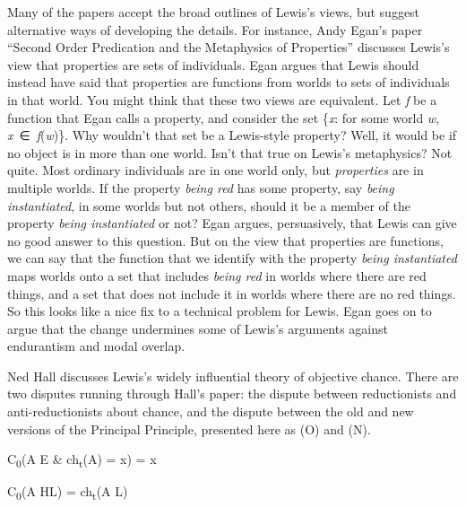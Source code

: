 \documentclass[
  10pt,
  letterpaper,
  DIV=11,
  numbers=noendperiod,
  twoside]{scrartcl}
\providecommand{\tightlist}{%
  \setlength{\itemsep}{0pt}\setlength{\parskip}{0pt}}\usepackage{longtable,booktabs,array}
\begin{document}
Many of the papers accept the broad outlines of Lewis's views, but
suggest alternative ways of developing the details. For instance, Andy
Egan's paper ``Second Order Predication and the Metaphysics of
Properties'' discusses Lewis's view that properties are sets of
individuals. Egan argues that Lewis should instead have said that
properties are functions from worlds to sets of individuals in that
world. You might think that these two views are equivalent. Let \emph{f}
be a function that Egan calls a property, and consider the set
\{\emph{x}: for some world \emph{w}, \emph{x}~∈~\emph{f}(\emph{w})\}.
Why wouldn't that set be a Lewis-style property? Well, it would be if no
object is in more than one world. Isn't that true on Lewis's
metaphysics? Not quite. Most ordinary individuals are in one world only,
but \emph{properties} are in multiple worlds. If the property
\emph{being red} has some property, say \emph{being instantiated}, in
some worlds but not others, should it be a member of the property
\emph{being instantiated} or not? Egan argues, persuasively, that Lewis
can give no good answer to this question. But on the view that
properties are functions, we can say that the function that we identify
with the property \emph{being instantiated} maps worlds onto a set that
includes \emph{being red} in worlds where there are red things, and a
set that does not include it in worlds where there are no red things. So
this looks like a nice fix to a technical problem for Lewis. Egan goes
on to argue that the change undermines some of Lewis's arguments against
endurantism and modal overlap.

Ned Hall discusses Lewis's widely influential theory of objective
chance. There are two disputes running through Hall's paper: the dispute
between reductionists and anti-reductionists about chance, and the
dispute between the old and new versions of the Principal Principle,
presented here as (O) and (N).

\begin{description}
\tightlist
\item[(O)]
C\textsubscript{0}(A \textbar{} E \& ch\textsubscript{t}(A) = x) = x
\item[(N)]
C\textsubscript{0}(A \textbar{} HL) = ch\textsubscript{t}(A \textbar{}
L)
\end{description}
\end{document}
